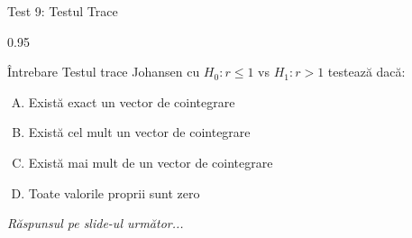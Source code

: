 \documentclass[9pt, aspectratio=169, t]{beamer}
\begin{document}
\begin{frame}{Test 9: Testul Trace}
    \begin{cminipage}{0.95\textwidth}
    \begin{alertblock}{Întrebare}
        Testul trace Johansen cu $H_0: r \leq 1$ vs $H_1: r > 1$ testează dacă:
    \end{alertblock}

    \vspace{0.3cm}

    \begin{enumerate}[A)]\setlength{\itemsep}{0pt}
        \item Există exact un vector de cointegrare
        \item Există cel mult un vector de cointegrare
        \item Există mai mult de un vector de cointegrare
        \item Toate valorile proprii sunt zero
    \end{enumerate}

    \vspace{0.5cm}
    \begin{flushright}\textit{Răspunsul pe slide-ul următor...}\end{flushright}
    \end{cminipage}
\end{frame}
\end{document}
